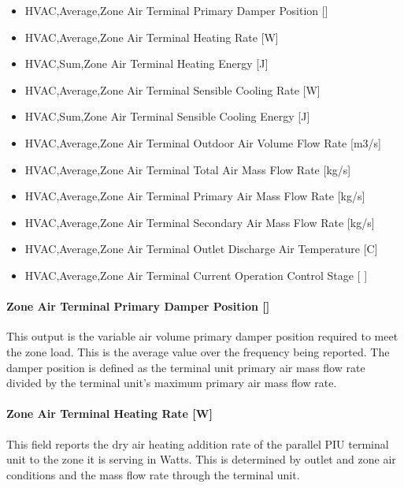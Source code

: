 \begin{itemize}
\item
  HVAC,Average,Zone Air Terminal Primary Damper Position {[]}
\item
  HVAC,Average,Zone Air Terminal Heating Rate {[}W{]}
\item
  HVAC,Sum,Zone Air Terminal Heating Energy {[}J{]}
\item
  HVAC,Average,Zone Air Terminal Sensible Cooling Rate {[}W{]}
\item
  HVAC,Sum,Zone Air Terminal Sensible Cooling Energy {[}J{]}
\item
  HVAC,Average,Zone Air Terminal Outdoor Air Volume Flow Rate {[}m3/s{]}
\item
  HVAC,Average,Zone Air Terminal Total Air Mass Flow Rate {[}kg/s{]}
\item
  HVAC,Average,Zone Air Terminal Primary Air Mass Flow Rate {[}kg/s{]}
\item
  HVAC,Average,Zone Air Terminal Secondary Air Mass Flow Rate {[}kg/s{]}
\item
  HVAC,Average,Zone Air Terminal Outlet Discharge Air Temperature {[}C{]}
\item
  HVAC,Average,Zone Air Terminal Current Operation Control Stage {[} {]}
\end{itemize}

\paragraph{Zone Air Terminal Primary Damper Position {[]}}\label{zone-air-terminal-parallel-piu-primary-damper-position}

This output is the variable air volume primary damper position required to meet the zone load. This is the average value over the frequency being reported. The damper position is defined as the terminal unit primary air mass flow rate divided by the terminal unit's maximum primary air mass flow rate.

\paragraph{Zone Air Terminal Heating Rate {[}W{]}}\label{zone-air-terminal-heating-rate-w-1}

This field reports the dry air heating addition rate of the parallel PIU terminal unit to the zone it is serving in Watts. This is determined by outlet and zone air conditions and the mass flow rate through the terminal unit.

